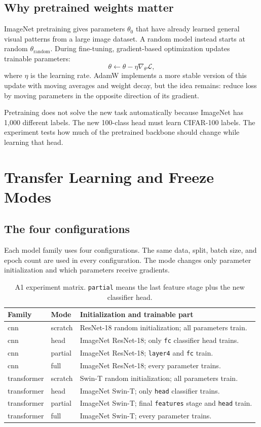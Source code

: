 \documentclass[oneside]{hcmut-report}
\begin{document}
\subsection{Why pretrained weights matter}
ImageNet pretraining gives parameters $\theta_0$ that have already learned general visual patterns from a large image dataset. A random model instead starts at random $\theta_{\mathrm{random}}$. During fine-tuning, gradient-based optimization updates trainable parameters:
\[
\theta\leftarrow\theta-\eta\nabla_\theta\mathcal{L},
\]
where $\eta$ is the learning rate. AdamW implements a more stable version of this update with moving averages and weight decay, but the idea remains: reduce loss by moving parameters in the opposite direction of its gradient.

Pretraining does not solve the new task automatically because ImageNet has 1,000 different labels. The new 100-class head must learn CIFAR-100 labels. The experiment tests how much of the pretrained backbone should change while learning that head.

\clearpage
\section{Transfer Learning and Freeze Modes}
\subsection{The four configurations}
Each model family uses four configurations. The same data, split, batch size, and epoch count are used in every configuration. The mode changes only parameter initialization and which parameters receive gradients.

\begin{table}[H]\centering\small
\caption{A1 experiment matrix. \texttt{partial} means the last feature stage plus the new classifier head.}\label{tab:matrix}
\begin{tabularx}{\textwidth}{>{\ttfamily}l>{\ttfamily}lX}\toprule
\textbf{Family} & \textbf{Mode} & \textbf{Initialization and trainable part} \\\midrule
cnn & scratch & ResNet-18 random initialization; all parameters train. \\
cnn & head & ImageNet ResNet-18; only \texttt{fc} classifier head trains. \\
cnn & partial & ImageNet ResNet-18; \texttt{layer4} and \texttt{fc} train. \\
cnn & full & ImageNet ResNet-18; every parameter trains. \\
transformer & scratch & Swin-T random initialization; all parameters train. \\
transformer & head & ImageNet Swin-T; only \texttt{head} classifier trains. \\
transformer & partial & ImageNet Swin-T; final \texttt{features} stage and \texttt{head} train. \\
transformer & full & ImageNet Swin-T; every parameter trains. \\\bottomrule
\end{tabularx}
\end{table}
\end{document}
